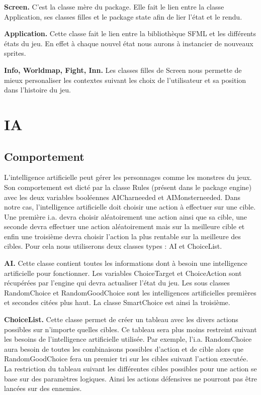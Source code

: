 \documentclass[12pt,a4paper]{report}
\begin{document}
\textbf{Screen.} C'est la classe m\`{e}re du package. Elle fait le lien entre la classe Application, ses classes filles et le package state afin de lier l'\'{e}tat et le rendu.

\textbf{Application.} Cette classe fait le lien entre la biblioth\`{e}que SFML et les diff\'{e}rents \'{e}tats du jeu. En effet \`{a} chaque nouvel \'{e}tat nous aurons \`{a} instancier de nouveaux sprites.

\textbf{Info, Worldmap, Fight, Inn.} Les classes filles de Screen nous permette de mieux personaliser les contextes suivant les choix de l'utilisateur et sa position dans l'histoire du jeu.


\chapter{IA}

\section{Comportement}

L'intelligence artificielle peut g\'{e}rer les personnages comme les monstres du jeux. Son comportement est dict\'{e} par la classe Rules (pr\'{e}sent dans le package engine) avec les deux variables bool\'{e}ennes AICharneeded et AIMonsterneeded.
Dans notre cas, l'intelligence artificielle doit choisir une action \`{a} effectuer sur une cible. Une premi\`{e}re i.a. devra choisir al\'{e}atoirement une action ainsi que sa cible, une seconde devra effectuer une action al\'{e}atoirement mais sur la meilleure cible et enfin une troisi\`{e}me devra choisir l'action la plus rentable sur la meilleure des cibles.
Pour cela nous utiliserons deux classes types : AI et ChoiceList.

\textbf{AI.} Cette classe contient toutes les informations dont \`{a} besoin une intelligence artificielle pour fonctionner. Les variables ChoiceTarget et ChoiceAction sont r\'{e}cup\'{e}r\'{e}es par l'engine qui devra actualiser l'\'{e}tat du jeu. Les sous classes RandomChoice et RandomGoodChoice sont les intelligences artificielles premi\`{e}res et secondes cit\'{e}es plus haut. La classe SmartChoice est ainsi la troisi\`{e}me.

\textbf{ChoiceList.} Cette classe permet de cr\'{e}er un tableau avec les divers actions possibles sur n'importe quelles cibles. Ce tableau sera plus moins restreint suivant les besoins de l'intelligence artificielle utilis\'{e}e. Par exemple, l'i.a. RandomChoice aura besoin de toutes les combinaisons possibles d'action et de cible alors que RandomGoodChoice fera un premier tri sur les cibles suivant l'action execut\'{e}e. La restriction du tableau suivant les diff\'{e}rentes cibles possibles pour une action se base sur des paramètres logiques. Ainsi les actions d\'{e}fensives ne pourront pas \^{e}tre lanc\'{e}es sur des ennemies.
\end{document}
